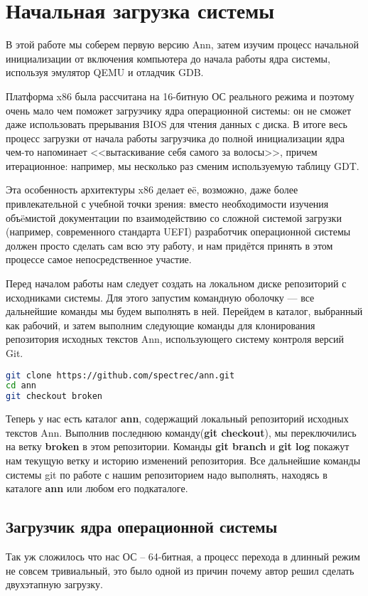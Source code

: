 \chapter{Начальная загрузка системы}
\label{cha:boot}

В этой работе мы соберем первую версию Ann, затем изучим процесс
начальной инициализации от включения компьютера до начала работы
ядра системы, используя эмулятор QEMU и отладчик GDB.

Платформа x86 была рассчитана на 16-битную ОС реального режима и
поэтому очень мало чем поможет загрузчику ядра операционной системы:
он не сможет даже использовать прерывания BIOS для чтения данных с диска.
В итоге весь процесс загрузки от начала работы загрузчика до
полной инициализации ядра чем-то напоминает <<вытаскивание себя самого
за волосы>>, причем итерационное: например, мы несколько раз сменим используемую таблицу GDT.

Эта особенность архитектуры x86 делает еë, возможно, даже более
привлекательной с учебной точки зрения: вместо необходимости изучения
объëмистой документации по взаимодействию со сложной системой
загрузки (например, современного стандарта UEFI) разработчик операционной
системы должен просто сделать сам всю эту работу, и нам придётся
принять в этом процессе самое непосредственное участие.

Перед началом работы нам следует создать на локальном диске репозиторий с
исходниками системы. Для этого запустим командную оболочку — все дальнейшие
команды мы будем выполнять в ней. Перейдем в каталог, выбранный как рабочий,
и затем выполним следующие команды для клонирования репозитория исходных
текстов Ann, использующего систему контроля версий Git.

\begin{lstlisting}[language=bash]
git clone https://github.com/spectrec/ann.git
cd ann
git checkout broken
\end{lstlisting}

Теперь у нас есть каталог \textbf{ann}, содержащий локальный
репозиторий исходных текстов Ann. Выполнив последнюю команду(\textbf{git checkout}),
мы переключились на ветку \textbf{broken} в этом репозитории. Команды \textbf{git branch} и
\textbf{git log} покажут нам текущую ветку и историю изменений
репозитория. Все дальнейшие команды системы git по работе с нашим репозиторием надо
выполнять, находясь в каталоге \textbf{ann} или любом его подкаталоге.

\section{Загрузчик ядра операционной системы}
Так уж сложилось что нас ОС -- 64-битная, а процесс перехода в длинный режим
не совсем тривиальный, это было одной из причин почему автор решил сделать
двухэтапную загрузку.

